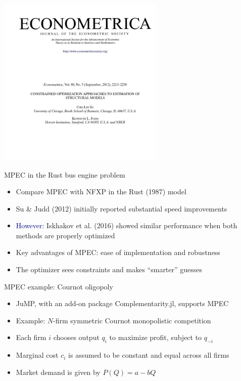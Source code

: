 \documentclass[aspectratio=169]{beamer}
\begin{document}
\begin{frame}
\centering
\includegraphics[width=0.6\textwidth]{Su_Judd_2012_Ecta_cover.jpg}
\end{frame}

\begin{frame}
MPEC in the Rust bus engine problem
\bigskip{}
\begin{itemize}
\itemsep1.5em
\item<2-> Compare MPEC with NFXP in the Rust (1987) model
\item<3-> Su \& Judd (2012) initially reported substantial speed improvements
\item<4-> \textcolor{navy}{However:} Iskhakov et al. (2016) showed similar performance when both methods are properly optimized
\item<5-> Key advantages of MPEC: ease of implementation and robustness
\item<6-> The optimizer sees constraints and makes ``smarter'' guesses
\end{itemize}
\end{frame}

\begin{frame}

MPEC example: Cournot oligopoly

\bigskip{}

\begin{itemize}
\itemsep1.5em
\item<2-> JuMP, with an add-on package Complementarity.jl, supports MPEC
\item<3-> Example: $N$-firm symmetric Cournot monopolistic competition
\item<4-> Each firm $i$ chooses output $q_i$ to maximize profit, subject to $q_{-i}$
\item<5-> Marginal cost $c_i$ is assumed to be constant and equal across all firms
\item<6-> Market demand is given by $P(Q) = a - bQ$
\end{itemize}

\end{frame}
\end{document}
